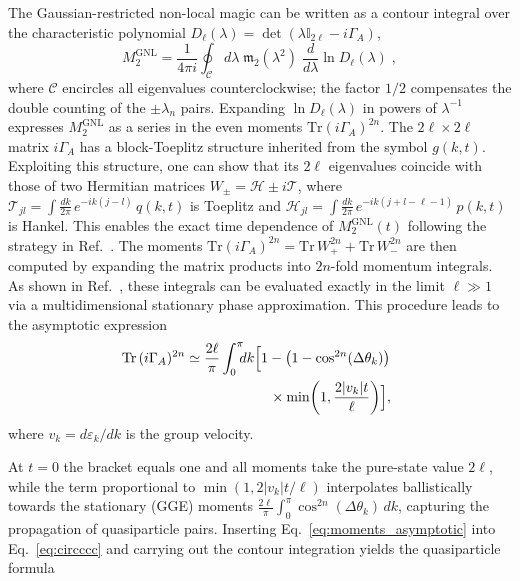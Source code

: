 \documentclass[aps,prl,twocolumn,superscriptaddress,reprint,longbibliography,nofootinbib]{revtex4-2}
\renewcommand{\cos}{\operatorname{cos}}\renewcommand{\sin}{\operatorname{sin}}\renewcommand{\tan}{\operatorname{tan}}
\providecommand{\DIFaddtex}[1]{{\protect\color{blue}\uwave{#1}}} %
\providecommand{\DIFaddbegin}{} %
\providecommand{\DIFaddend}{} %
\providecommand{\DIFadd}[1]{\texorpdfstring{\DIFaddtex{#1}}{#1}} %
\newcommand{\DIFaddincludegraphics}[2][]{{\color{blue}\fbox{\DIFOincludegraphics[#1]{#2}}}} %
\DeclareRobustCommand{\DIFaddbegin}{\DIFOaddbegin \let\includegraphics\DIFaddincludegraphics} %
\DeclareRobustCommand{\DIFaddend}{\DIFOaddend \let\includegraphics\DIFOincludegraphics} %
\begin{document}
The Gaussian-restricted non-local magic can be written as a contour integral over the characteristic polynomial $D_\ell(\lambda) = \det(\lambda \mathbb{I}_{2\ell} - i\Gamma_A)$,
\begin{equation}
    M_2^{\mathrm{GNL}} = \frac{1}{4\pi i}\oint_\mathcal{C}d\lambda\;\mathfrak{m}_2(\lambda^2)\;\frac{d}{d\lambda}\ln D_\ell(\lambda)\;,\label{eq:circccc}
\end{equation}
where $\mathcal{C}$ encircles all eigenvalues counterclockwise; the factor $1/2$ compensates the double counting of the $\pm\lambda_n$ pairs.
Expanding $\ln D_\ell(\lambda)$ in powers of $\lambda^{-1}$ expresses $M_2^{\mathrm{GNL}}$ as a series in the even moments $\mathrm{Tr}(i\Gamma_A)^{2n}$.
The $2\ell \times 2\ell$ matrix $i\Gamma_A$ has a block-Toeplitz structure inherited from the symbol $g(k,t)$.
Exploiting this structure, one can show that its $2\ell$ eigenvalues coincide with those of two Hermitian matrices $W_\pm = \mathcal{H} \pm i\mathcal{T}$, where $\mathcal{T}_{jl} = \int \frac{dk}{2\pi}\,e^{-ik(j-l)}\,q(k,t)$ is Toeplitz and $\mathcal{H}_{jl} = \int \frac{dk}{2\pi}\,e^{-ik(j+l-\ell-1)}\,p(k,t)$ is Hankel. This enables the exact time dependence of $M_2^\mathrm{GNL}(t)$ following the strategy in Ref.~\cite{Fagotti2008}. 
The moments $\mathrm{Tr}(i\Gamma_A)^{2n} = \mathrm{Tr}\,W_+^{2n} + \mathrm{Tr}\,W_-^{2n}$ are then computed by expanding the matrix products into $2n$-fold momentum integrals.
As shown in Ref.~\cite{Fagotti2008}, these integrals can be evaluated exactly in the limit $\ell \gg 1$ via a multidimensional stationary phase approximation.
This procedure leads to the asymptotic expression\begin{equation}
\begin{split}
   \!\!\! \mathrm{Tr}\,(i\Gamma_A)^{2n}&\simeq \frac{2\ell}{\pi}\int_0^\pi\!\!\!dk\Bigl[1-\bigl(1-\cos^{2n}(\Delta\theta_k)\bigr)\\
   &\qquad\qquad\qquad\times\min\!\left(1, \frac{2|v_k|t}{\ell}\right)\Bigr],
\end{split}
\label{eq:moments_asymptotic}
\end{equation}
where $v_k = d\varepsilon_k/dk$ is the group velocity.

At $t=0$ the bracket equals one and all moments take the pure-state value $2\ell$, while the term proportional to $\min(1,2|v_k|t/\ell)$ interpolates ballistically towards  the stationary (GGE) moments $\frac{2\ell}{\pi}\int_0^\pi\cos^{2n}(\Delta\theta_k)\,dk$, capturing the propagation of quasiparticle pairs.
Inserting Eq.~\eqref{eq:moments_asymptotic} into Eq.~\eqref{eq:circccc} and carrying out the contour integration yields the quasiparticle formula\DIFaddbegin \DIFadd{, Eq.~\eqref{eq:fagotti_mnl}.
}\DIFaddend 
\end{document}
